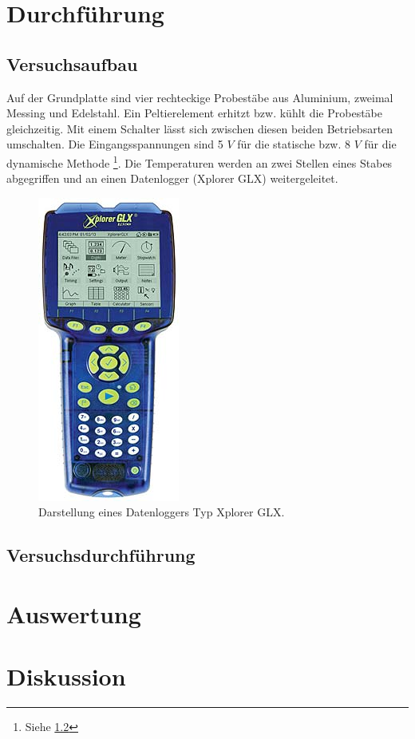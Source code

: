 \section{Durchführung}
\subsection{Versuchsaufbau}
Auf der Grundplatte sind vier rechteckige Probestäbe aus Aluminium, zweimal Messing
und Edelstahl. Ein Peltierelement erhitzt bzw. kühlt die Probestäbe gleichzeitig.
Mit einem Schalter lässt sich zwischen diesen beiden Betriebsarten umschalten.
Die Eingangsspannungen sind 5 $\textit{V}$ für die statische bzw. 8 $\textit{V}$
für die dynamische Methode \footnote{Siehe \ref{sec:1}}. Die Temperaturen werden
an zwei Stellen eines Stabes abgegriffen und an einen Datenlogger (Xplorer GLX)
weitergeleitet.
\begin{figure}
  \centering
  \includegraphics[scale=0.5]{xplorer_glx.jpg}
  \caption{Darstellung eines Datenloggers Typ Xplorer GLX.}
  \label{fig:1}
\end{figure}
\subsection{Versuchsdurchführung}
\label{sec:1}
\section{Auswertung}
\section{Diskussion}
\newpage
\nocite{*}
\printbibliography
